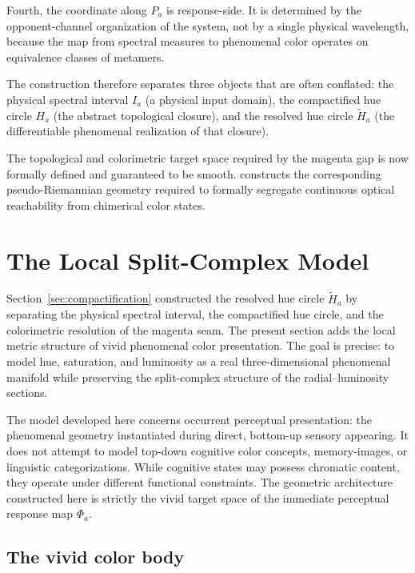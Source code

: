 \documentclass[preprint,12pt,authoryear]{elsarticle}
\theoremstyle{plain}
\theoremstyle{definition}
\theoremstyle{remark}
\begin{document}
Fourth, the coordinate along $P_a$ is response-side. It is determined by the opponent-channel organization of the system, not by a single physical wavelength, because the map from spectral measures to phenomenal color operates on equivalence classes of metamers.

The construction therefore separates three objects that are often conflated: the physical spectral interval $I_a$ (a physical input domain), the compactified hue circle $H_a$ (the abstract topological closure), and the resolved hue circle $\widetilde H_a$ (the differentiable phenomenal realization of that closure).

The topological and colorimetric target space required by the magenta gap is now formally defined and guaranteed to be smooth.  constructs the corresponding pseudo-Riemannian geometry required to formally segregate continuous optical reachability from chimerical color states.

\section{The Local Split-Complex Model}
\label{sec:local-model}

\noindent Section~\ref{sec:compactification} constructed the resolved hue circle $\widetilde H_a$ by separating the physical spectral interval, the compactified hue circle, and the colorimetric resolution of the magenta seam. The present section adds the local metric structure of vivid phenomenal color presentation. The goal is precise: to model hue, saturation, and luminosity as a real three-dimensional phenomenal manifold while preserving the split-complex structure of the radial--luminosity sections.

The model developed here concerns occurrent perceptual presentation: the phenomenal geometry instantiated during direct, bottom-up sensory appearing. It does not attempt to model top-down cognitive color concepts, memory-images, or linguistic categorizations. While cognitive states may possess chromatic content, they operate under different functional constraints. The geometric architecture constructed here is strictly the vivid target space of the immediate perceptual response map $\Phi_a$.

\subsection{The vivid color body}
\label{subsec:vivid-color-body}
\end{document}
